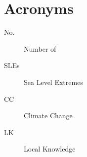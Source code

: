 
\chapter{Acronyms}
\begin{description}
\item[No.] Number of
\item[SLEs] Sea Level Extremes
\item[CC] Climate Change
\item[LK] Local Knowledge
\end{description}